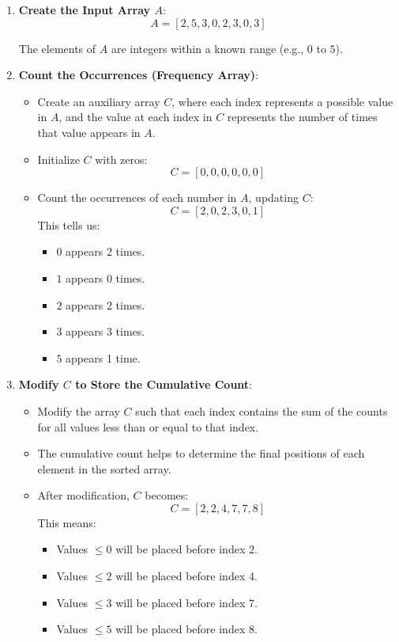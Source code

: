 \begin{example}
    \begin{enumerate}
        \item \textbf{Create the Input Array \( A \)}:
            \[
            A = [2, 5, 3, 0, 2, 3, 0, 3]
            \]
        
        The elements of \( A \) are integers within a known range (e.g., \( 0 \) to \( 5 \)).

        
        \item \textbf{Count the Occurrences (Frequency Array)}:
        \begin{itemize}
            \item Create an auxiliary array \( C \), where each index represents a possible value in \( A \), and the value at each index in \( C \) represents the number of times that value appears in \( A \).
            \item Initialize \( C \) with zeros:
            \[
            C = [0, 0, 0, 0, 0, 0]
            \]
            \item Count the occurrences of each number in \( A \), updating \( C \):
            \[
            C = [2, 0, 2, 3, 0, 1]
            \]
            This tells us:
            \begin{itemize}
                \item \( 0 \) appears 2 times.
                \item \( 1 \) appears 0 times.
                \item \( 2 \) appears 2 times.
                \item \( 3 \) appears 3 times.
                \item \( 5 \) appears 1 time.
            \end{itemize}
        \end{itemize}
        
        \item \textbf{Modify \( C \) to Store the Cumulative Count}:
        \begin{itemize}
            \item Modify the array \( C \) such that each index contains the sum of the counts for all values less than or equal to that index.
            \item The cumulative count helps to determine the final positions of each element in the sorted array.
            \item After modification, \( C \) becomes:
            \[
            C = [2, 2, 4, 7, 7, 8]
            \]
            This means:
            \begin{itemize}
                \item Values \( \leq 0 \) will be placed before index 2.
                \item Values \( \leq 2 \) will be placed before index 4.
                \item Values \( \leq 3 \) will be placed before index 7.
                \item Values \( \leq 5 \) will be placed before index 8.
            \end{itemize}
        \end{itemize}
        

\end{enumerate}
\end{example}
